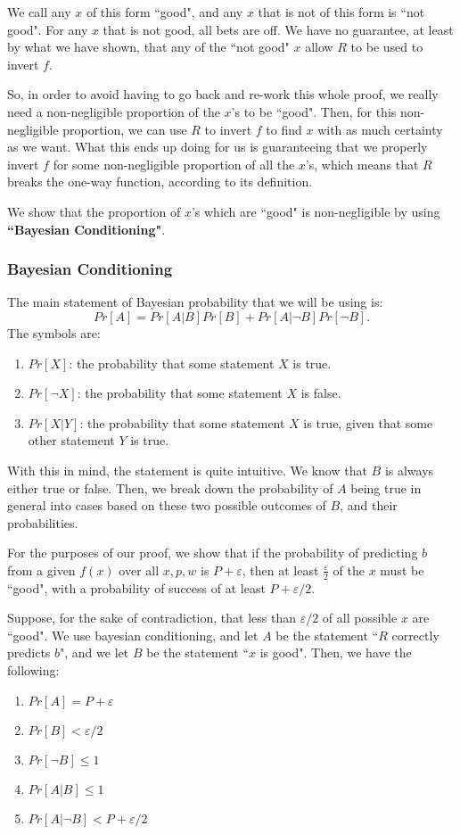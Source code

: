 \documentclass[11pt]{article}
\begin{document}
We call any \(x\) of this form ``good", and any \(x\) that is not of this form is ``not good". For any \(x\) that is not good, all bets are off. We have no guarantee, at least by what we have shown, that any of the ``not good" \(x\) allow \(R\) to be used to invert \(f\). 

So, in order to avoid having to go back and re-work this whole proof, we really need a non-negligible proportion of the \(x\)'s to be ``good". Then, for this non-negligible proportion, we can use \(R\) to invert \(f\) to find \(x\) with as much certainty as we want. What this ends up doing for us is guaranteeing that we properly invert \(f\) for some non-negligible proportion of all the \(x\)'s, which means that \(R\) breaks the one-way function, according to its definition.

We show that the proportion of \(x\)'s which are ``good" is non-negligible by using \textbf{``Bayesian Conditioning"}.

\newpage
\subsubsection{Bayesian Conditioning}
The main statement of Bayesian probability that we will be using is:
\[Pr[A] = Pr[A|B]Pr[B] + Pr[A|\neg B]Pr[\neg B].\]
The symbols are: 
\begin{enumerate}
\item \(Pr[X]\): the probability that some statement \(X\) is true.
\item \(Pr[\neg X]\): the probability that some statement \(X\) is false.
\item \(Pr[X| Y]\): the probability that some statement \(X\) is true, given that some other statement \(Y\) is true.
\end{enumerate}

With this in mind, the statement is quite intuitive. We know that \(B\) is always either true or false. Then, we break down the probability of \(A\) being true in general into cases based on these two possible outcomes of \(B\), and their probabilities.\medskip

For the purposes of our proof, we show that if the probability of predicting \(b\) from a given \(f(x)\) over all \(x,p,w\) is \(P+\varepsilon\), then at least \(\frac{\varepsilon}{2}\) of the \(x\) must be ``good", with a probability of success of at least \(P+\varepsilon/2\).\medskip

Suppose, for the sake of contradiction, that less than \(\varepsilon/2\) of all possible \(x\) are ``good". We use bayesian conditioning, and let \(A\) be the statement ``\(R\) correctly predicts \(b\)", and we let \(B\) be the statement ``\(x\) is good". Then, we have the following:
\begin{enumerate}
\item \(Pr[A]=P+\varepsilon\)
\item \(Pr[B] <\varepsilon/2\)
\item \(Pr[\neg B]\le 1\)
\item \(Pr[A|B] \le 1\)
\item \(Pr[A|\neg B] < P + \varepsilon/2\)
\end{enumerate}
\end{document}
